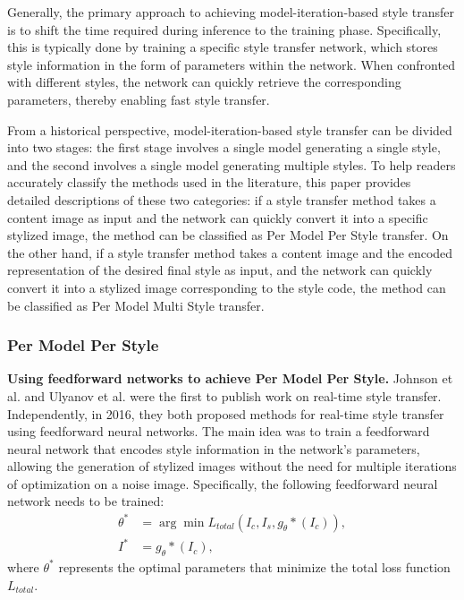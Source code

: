 \documentclass[preprint,12pt]{elsarticle}
\begin{document}
Generally, the primary approach to achieving model-iteration-based style transfer is to shift the time required during inference to the training phase. Specifically, this is typically done by training a specific style transfer network, which stores style information in the form of parameters within the network. When confronted with different styles, the network can quickly retrieve the corresponding parameters, thereby enabling fast style transfer.

From a historical perspective, model-iteration-based style transfer can be divided into two stages: the first stage involves a single model generating a single style, and the second involves a single model generating multiple styles. To help readers accurately classify the methods used in the literature, this paper provides detailed descriptions of these two categories: if a style transfer method takes a content image as input and the network can quickly convert it into a specific stylized image, the method can be classified as Per Model Per Style transfer. On the other hand, if a style transfer method takes a content image and the encoded representation of the desired final style as input, and the network can quickly convert it into a stylized image corresponding to the style code, the method can be classified as Per Model Multi Style transfer. 

\subsubsection{Per Model Per Style}

\textbf{Using feedforward networks to achieve Per Model Per Style.} Johnson et al.\citep{22johnson2016perceptual} and Ulyanov et al.\citep{23ulyanov2016texture} were the first to publish work on real-time style transfer. Independently, in 2016, they both proposed methods for real-time style transfer using feedforward neural networks. The main idea was to train a feedforward neural network that encodes style information in the network's parameters, allowing the generation of stylized images without the need for multiple iterations of optimization on a noise image. Specifically, the following feedforward neural network needs to be trained: 
\begin{equation}
    \begin{aligned}
        \theta^* &= \arg\min L_{total}\left(I_c,I_s,g_\theta*(I_c)\right),\\
        I^*&=g_\theta*(I_c),
    \end{aligned}
\end{equation}
where $\theta^*$ represents the optimal parameters that minimize the total loss function $L_{total}$.
\end{document}
